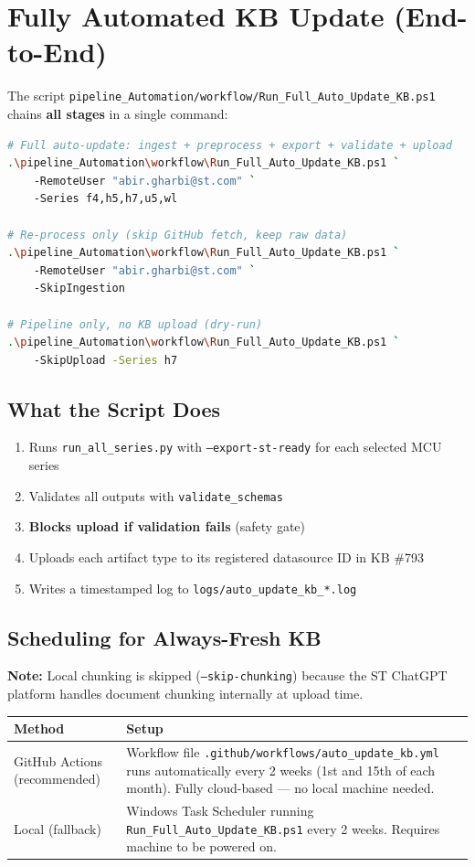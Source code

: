 \documentclass[12pt,a4paper]{report}
\begin{document}
\section{Fully Automated KB Update (End-to-End)}

The script \texttt{pipeline\_Automation/workflow/Run\_Full\_Auto\_Update\_KB.ps1} chains \textbf{all stages} in a single command:

\begin{lstlisting}[language=bash]
# Full auto-update: ingest + preprocess + export + validate + upload
.\pipeline_Automation\workflow\Run_Full_Auto_Update_KB.ps1 `
    -RemoteUser "abir.gharbi@st.com" `
    -Series f4,h5,h7,u5,wl

# Re-process only (skip GitHub fetch, keep raw data)
.\pipeline_Automation\workflow\Run_Full_Auto_Update_KB.ps1 `
    -RemoteUser "abir.gharbi@st.com" `
    -SkipIngestion

# Pipeline only, no KB upload (dry-run)
.\pipeline_Automation\workflow\Run_Full_Auto_Update_KB.ps1 `
    -SkipUpload -Series h7
\end{lstlisting}

\subsection{What the Script Does}

\begin{enumerate}
  \item Runs \texttt{run\_all\_series.py} with \texttt{--export-st-ready} for each selected MCU series
  \item Validates all outputs with \texttt{validate\_schemas}
  \item \textbf{Blocks upload if validation fails} (safety gate)
  \item Uploads each artifact type to its registered datasource ID in KB \#793
  \item Writes a timestamped log to \texttt{logs/auto\_update\_kb\_*.log}
\end{enumerate}

\subsection{Scheduling for Always-Fresh KB}

\textbf{Note:} Local chunking is skipped (\texttt{--skip-chunking}) because the ST ChatGPT platform handles document chunking internally at upload time.

\begin{longtable}{p{4cm}p{9cm}}
\toprule
\textbf{Method} & \textbf{Setup} \\
\midrule
GitHub Actions (recommended) & Workflow file \texttt{.github/workflows/auto\_update\_kb.yml} runs automatically every 2 weeks (1st and 15th of each month). Fully cloud-based --- no local machine needed. \\
Local (fallback) & Windows Task Scheduler running \texttt{Run\_Full\_Auto\_Update\_KB.ps1} every 2 weeks. Requires machine to be powered on. \\
\bottomrule
\end{longtable}
\end{document}
